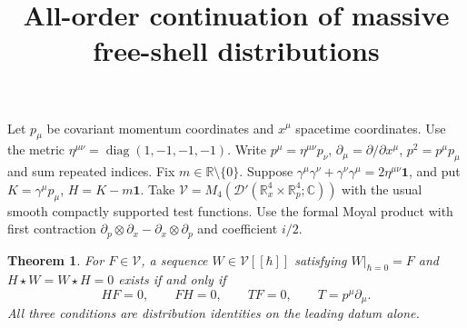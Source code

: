 \documentclass[11pt]{article}
\title{All-order continuation of massive free-shell distributions}
\author{}\date{}
\newtheorem*{theorem}{Theorem}
\newcommand{\Ds}{\mathcal D'}
\newcommand{\id}{\mathbf 1}
\newcommand{\dd}{\partial}
\DeclareMathOperator{\diag}{diag}
\begin{document}
\maketitle
\vspace{-2em}
Let $p_\mu$ be covariant momentum coordinates and $x^\mu$ spacetime coordinates. Use the metric
$\eta^{\mu\nu}=\diag(1,-1,-1,-1)$. Write $p^\mu=\eta^{\mu\nu}p_\nu$,
$\dd_\mu=\dd/\dd x^\mu$, $p^2=p^\mu p_\mu$ and sum repeated indices.
Fix $m\in\mathbb R\setminus\{0\}$. Suppose $\gamma^\mu\gamma^\nu+\gamma^\nu\gamma^\mu
=2\eta^{\mu\nu}\id$, and put $K=\gamma^\mu p_\mu$, $H=K-m\id$.
Take $\mathcal V=M_4(\Ds(\mathbb R^4_x\times\mathbb R^4_p;\mathbb C))$
with the usual smooth compactly supported test functions.
Use the formal Moyal product with first contraction
$\partial_p\otimes\partial_x-\partial_x\otimes\partial_p$ and coefficient $i/2$.

\begin{theorem}
For $F\in\mathcal V$, a sequence $W\in\mathcal V[[\hbar]]$ satisfying
$W|_{\hbar=0}=F$ and $H\star W=W\star H=0$ exists if and only if
\[
 HF=0,\qquad FH=0,\qquad TF=0,\qquad T=p^\mu\dd_\mu .
\]
All three conditions are distribution identities on the leading datum alone.
\end{theorem}
\end{document}

